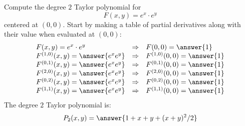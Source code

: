 \documentclass{ximera}
\author{Bart Snapp}
\begin{document}
\begin{exercise}
  Compute the degree $2$ Taylor polynomial for
  \[
  F(x,y) = e^x \cdot e^y
  \]
  centered at $(0,0)$. Start by making a table of partial
  derivatives along with their value when evaluated at $(0,0)$:
  \[
  \begin{array}{lcl}
    F(x,y) = e^x\cdot e^y & \Rightarrow &F(0,0) = \answer{1}\\
    F^{(1,0)}(x,y) = \answer{e^x e^y} & \Rightarrow & F^{(1,0)}(0,0) = \answer{1}\\
    F^{(0,1)}(x,y) = \answer{e^x e^y} &\Rightarrow  & F^{(0,1)}(0,0) = \answer{1}\\
    F^{(2,0)}(x,y) = \answer{e^x e^y} &\Rightarrow & F^{(2,0)}(0,0) = \answer{1}\\
    F^{(0,2)}(x,y) = \answer{e^x e^y} &\Rightarrow & F^{(0,2)}(0,0) = \answer{1}\\
    F^{(1,1)}(x,y) = \answer{e^x e^y} &\Rightarrow & F^{(1,1)}(0,0) = \answer{1}
    \end{array}
    \]
    The degree $2$ Taylor polynomial is:
    \[
    P_2(x,y) =\answer{1+x+y+(x+y)^2/2}
    \]
\end{exercise}
\end{document}
